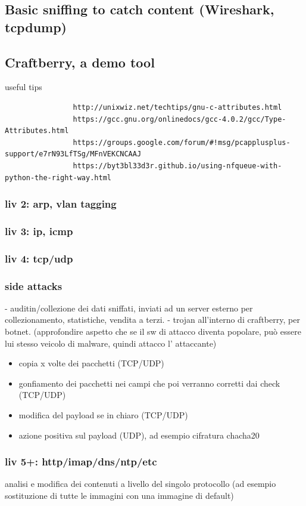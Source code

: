 \documentclass[]{article}
\begin{document}
	\subsection{Basic sniffing to catch content (Wireshark, tcpdump)}
	\subsection{Craftberry, a demo tool}
			useful tips
			\begin{verbatim}
				http://unixwiz.net/techtips/gnu-c-attributes.html
				https://gcc.gnu.org/onlinedocs/gcc-4.0.2/gcc/Type-Attributes.html
				https://groups.google.com/forum/#!msg/pcapplusplus-support/e7rN93LfTSg/MFnVEKCNCAAJ
				https://byt3bl33d3r.github.io/using-nfqueue-with-python-the-right-way.html
			\end{verbatim}
			
			\subsubsection{liv 2: arp, vlan tagging}
			\subsubsection{liv 3: ip, icmp}
			\subsubsection{liv 4: tcp/udp}
			\subsubsection{side attacks}
				- auditin/collezione dei dati sniffati, inviati ad un server esterno per collezionamento, statistiche, vendita a terzi.
				- trojan all'interno di craftberry, per botnet. (approfondire aspetto che se il sw di attacco diventa popolare, può essere lui stesso veicolo di malware, quindi attacco l' attaccante)
			
			\begin{itemize}
				\item copia x volte dei pacchetti (TCP/UDP)
				\item gonfiamento dei pacchetti nei campi che poi verranno corretti dai check (TCP/UDP)
				\item modifica del payload se in chiaro (TCP/UDP)
				\item azione positiva sul payload (UDP), ad esempio cifratura chacha20
			\end{itemize}
		 	\subsubsection{liv 5+: http/imap/dns/ntp/etc}
				analisi e modifica dei contenuti a livello del singolo protocollo (ad esempio sostituzione di tutte le immagini con una immagine di default)
			
\end{document}
